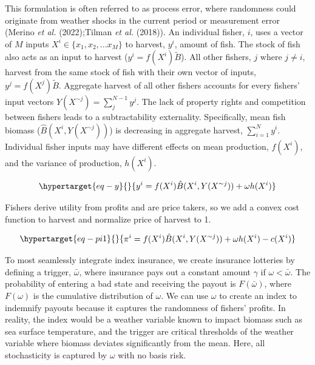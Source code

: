 \documentclass[
  letterpaper,
  DIV=11,
  numbers=noendperiod]{scrartcl}
\theoremstyle{plain}
\theoremstyle{plain}
\theoremstyle{remark}
\begin{document}
This formulation is often referred to as process error, where randomness
could originate from weather shocks in the current period or measurement
error (Merino \emph{et al.} (2022);Tilman \emph{et al.} (2018)). An
individual fisher, \(i\), uses a vector of \(M\) inputs
\(X^i\in\{{x_1,x_2,...x_M}\}\) to harvest, \(y^i\), amount of fish. The
stock of fish also acts as an input to harvest
(\(y^i=f(X^i)\tilde{B}\)). All other fishers,
\(j \text{ where } j\ne i\), harvest from the same stock of fish with
their own vector of inputs, \(y^j=f(X^ j)\tilde{B}\). Aggregate harvest
of all other fishers accounts for every fishers' input vectors
\(Y(X^{\sim j})=\sum ^{N-1}_jy^j\). The lack of property rights and
competition between fishers leads to a subtractability externality.
Specifically, mean fish biomass (\(\hat{B}(X^i,Y(X^{\sim j}))\)) is
decreasing in aggregate harvest, \(\sum^{N}_{i=1} y^i\). Individual
fisher inputs may have different effects on mean production, \(f(X^i)\),
and the variance of production, \(h(X^i)\).

\begin{equation}\protect\hypertarget{eq-y}{}{
y^i=f(X^i)\hat{B}(X^i,Y(X^{\sim j}))+\omega h(X^i)
}\label{eq-y}\end{equation}

Fishers derive utility from profits and are price takers, so we add a
convex cost function to harvest and normalize price of harvest to 1.

\begin{equation}\protect\hypertarget{eq-pi1}{}{
\begin{aligned}
\pi^i=f(X^i)\hat{B}(X^i,Y(X^{\sim j}))+\omega h(X^i)-c(X^i)
\end{aligned}
}\label{eq-pi1}\end{equation}

To most seamlessly integrate index insurance, we create insurance
lotteries by defining a trigger, \(\bar\omega\), where insurance pays
out a constant amount \(\gamma\) if \(\omega<\bar\omega\). The
probability of entering a bad state and receiving the payout is
\(F(\bar\omega)\), where \(F(\omega)\) is the cumulative distribution of
\(\omega\). We can use \(\omega\) to create an index to indemnify
payouts because it captures the randomness of fishers' profits. In
reality, the index would be a weather variable known to impact biomass
such as sea surface temperature, and the trigger are critical thresholds
of the weather variable where biomass deviates significantly from the
mean. Here, all stochasticity is captured by \(\omega\) with no basis
risk.
\end{document}
